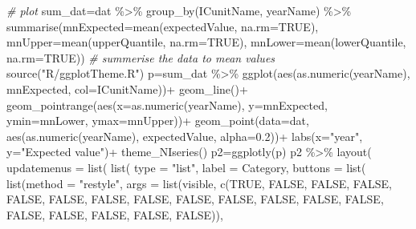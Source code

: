 \documentclass[
]{book}
\newenvironment{Shaded}{\begin{snugshade}}{\end{snugshade}}
\newcommand{\AttributeTok}[1]{\textcolor[rgb]{0.77,0.63,0.00}{#1}}
\newcommand{\CommentTok}[1]{\textcolor[rgb]{0.56,0.35,0.01}{\textit{#1}}}
\newcommand{\ConstantTok}[1]{\textcolor[rgb]{0.00,0.00,0.00}{#1}}
\newcommand{\FloatTok}[1]{\textcolor[rgb]{0.00,0.00,0.81}{#1}}
\newcommand{\FunctionTok}[1]{\textcolor[rgb]{0.00,0.00,0.00}{#1}}
\newcommand{\NormalTok}[1]{#1}
\newcommand{\OtherTok}[1]{\textcolor[rgb]{0.56,0.35,0.01}{#1}}
\newcommand{\SpecialCharTok}[1]{\textcolor[rgb]{0.00,0.00,0.00}{#1}}
\newcommand{\StringTok}[1]{\textcolor[rgb]{0.31,0.60,0.02}{#1}}
\begin{document}
\begin{Shaded}
\begin{Highlighting}[]
\CommentTok{\# plot}
\NormalTok{sum\_dat}\OtherTok{=}\NormalTok{dat }\SpecialCharTok{\%\textgreater{}\%} 
  \FunctionTok{group\_by}\NormalTok{(ICunitName, yearName) }\SpecialCharTok{\%\textgreater{}\%} 
  \FunctionTok{summarise}\NormalTok{(}\AttributeTok{mnExpected=}\FunctionTok{mean}\NormalTok{(expectedValue, }\AttributeTok{na.rm=}\ConstantTok{TRUE}\NormalTok{),}
            \AttributeTok{mnUpper=}\FunctionTok{mean}\NormalTok{(upperQuantile, }\AttributeTok{na.rm=}\ConstantTok{TRUE}\NormalTok{),}
            \AttributeTok{mnLower=}\FunctionTok{mean}\NormalTok{(lowerQuantile, }\AttributeTok{na.rm=}\ConstantTok{TRUE}\NormalTok{)) }\CommentTok{\# summerise the data to mean values}
\FunctionTok{source}\NormalTok{(}\StringTok{"R/ggplotTheme.R"}\NormalTok{)}
\NormalTok{p}\OtherTok{=}\NormalTok{sum\_dat }\SpecialCharTok{\%\textgreater{}\%} 
  \FunctionTok{ggplot}\NormalTok{(}\FunctionTok{aes}\NormalTok{(}\FunctionTok{as.numeric}\NormalTok{(yearName), mnExpected, }\AttributeTok{col=}\NormalTok{ICunitName))}\SpecialCharTok{+}
  \FunctionTok{geom\_line}\NormalTok{()}\SpecialCharTok{+}
  \FunctionTok{geom\_pointrange}\NormalTok{(}\FunctionTok{aes}\NormalTok{(}\AttributeTok{x=}\FunctionTok{as.numeric}\NormalTok{(yearName), }\AttributeTok{y=}\NormalTok{mnExpected, }\AttributeTok{ymin=}\NormalTok{mnLower, }\AttributeTok{ymax=}\NormalTok{mnUpper))}\SpecialCharTok{+}
  \FunctionTok{geom\_point}\NormalTok{(}\AttributeTok{data=}\NormalTok{dat, }\FunctionTok{aes}\NormalTok{(}\FunctionTok{as.numeric}\NormalTok{(yearName), expectedValue, }\AttributeTok{alpha=}\FloatTok{0.2}\NormalTok{))}\SpecialCharTok{+}
  \FunctionTok{labs}\NormalTok{(}\AttributeTok{x=}\StringTok{"year"}\NormalTok{, }\AttributeTok{y=}\StringTok{"Expected value"}\NormalTok{)}\SpecialCharTok{+}
  \FunctionTok{theme\_NIseries}\NormalTok{()}
\NormalTok{p2}\OtherTok{=}\FunctionTok{ggplotly}\NormalTok{(p)}
\NormalTok{p2 }\SpecialCharTok{\%\textgreater{}\%} \FunctionTok{layout}\NormalTok{(}
  \AttributeTok{updatemenus =} \FunctionTok{list}\NormalTok{(}
    \FunctionTok{list}\NormalTok{(}
      \AttributeTok{type =} \StringTok{"list"}\NormalTok{,}
      \AttributeTok{label =} \StringTok{\textquotesingle{}Category\textquotesingle{}}\NormalTok{,}
      \AttributeTok{buttons =} \FunctionTok{list}\NormalTok{(}
        \FunctionTok{list}\NormalTok{(}\AttributeTok{method =} \StringTok{"restyle"}\NormalTok{,}
             \AttributeTok{args =} \FunctionTok{list}\NormalTok{(}\StringTok{\textquotesingle{}visible\textquotesingle{}}\NormalTok{, }\FunctionTok{c}\NormalTok{(}\ConstantTok{TRUE}\NormalTok{, }\ConstantTok{FALSE}\NormalTok{, }\ConstantTok{FALSE}\NormalTok{, }\ConstantTok{FALSE}\NormalTok{, }\ConstantTok{FALSE}\NormalTok{, }\ConstantTok{FALSE}\NormalTok{, }\ConstantTok{FALSE}\NormalTok{, }\ConstantTok{FALSE}\NormalTok{, }\ConstantTok{FALSE}\NormalTok{, }\ConstantTok{FALSE}\NormalTok{, }\ConstantTok{FALSE}\NormalTok{, }\ConstantTok{FALSE}\NormalTok{, }\ConstantTok{FALSE}\NormalTok{, }\ConstantTok{FALSE}\NormalTok{, }\ConstantTok{FALSE}\NormalTok{, }\ConstantTok{FALSE}\NormalTok{, }\ConstantTok{FALSE}\NormalTok{, }\ConstantTok{FALSE}\NormalTok{)),}

\end{Highlighting}
\end{Shaded}
\end{document}
